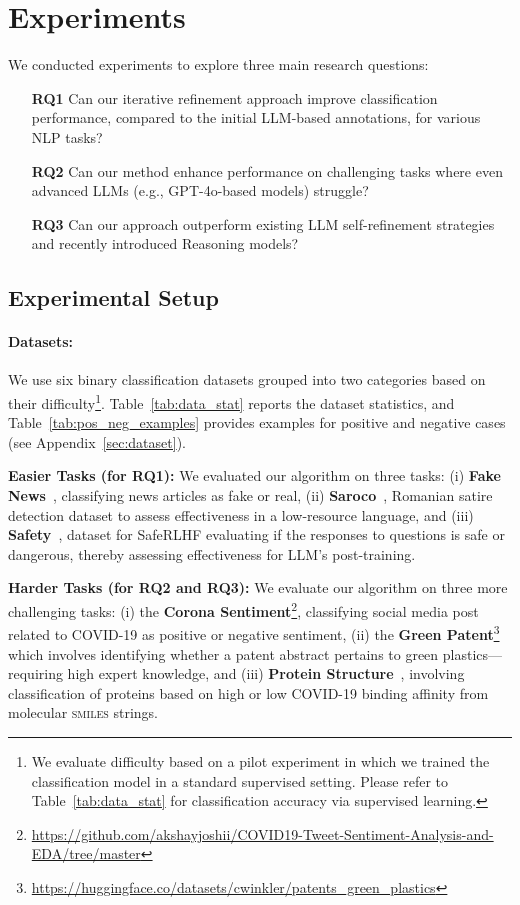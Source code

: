 \section{Experiments}
We conducted experiments to explore three main research questions:

\begin{enumerate}
    \item[\textbf{RQ1}] Can our iterative refinement approach improve classification performance, compared to the initial LLM-based annotations, for various NLP tasks?
    \item[\textbf{RQ2}] Can our method enhance performance on challenging tasks where even advanced LLMs (e.g., GPT-4o-based models) struggle?
    \item[\textbf{RQ3}] Can our approach outperform existing LLM self-refinement strategies and recently introduced Reasoning models?
\end{enumerate}

\subsection{Experimental Setup}
\paragraph{Datasets:}
We use six binary classification datasets grouped into two categories based on their difficulty\footnote{We evaluate difficulty based on a pilot experiment in which we trained the classification model in a standard supervised setting. Please refer to Table~\ref{tab:data_stat} for classification accuracy via supervised learning.}. Table~\ref{tab:data_stat} reports the dataset statistics, and Table~\ref{tab:pos_neg_examples} provides examples for positive and negative cases (see Appendix~\ref{sec:dataset}).

\textbf{Easier Tasks (for RQ1):} We evaluated our algorithm on three tasks: (i) \textbf{Fake News}~\citep{ahmed2018detecting}, classifying news articles as fake or real, (ii) \textbf{Saroco}~\citep{rogoz-etal-2021-saroco}, Romanian satire detection dataset to assess effectiveness in a low-resource language, and (iii) \textbf{Safety}~\citep{Dai2024-jq}, dataset for SafeRLHF evaluating if the responses to questions is safe or dangerous, thereby assessing effectiveness for LLM's post-training.

\textbf{Harder Tasks (for RQ2 and RQ3):} We evaluate our algorithm on three more challenging tasks: (i) the \textbf{Corona Sentiment}\footnote{\scriptsize{\url{https://github.com/akshayjoshii/COVID19-Tweet-Sentiment-Analysis-and-EDA/tree/master}}}, classifying social media post related to COVID-19 as positive or negative sentiment, (ii) the \textbf{Green Patent}\footnote{\scriptsize{\url{https://huggingface.co/datasets/cwinkler/patents_green_plastics}}} which involves identifying whether a patent abstract pertains to green plastics—requiring high expert knowledge, and (iii) \textbf{Protein Structure}~\citep{Blanchard2022-lx}, involving classification of proteins based on high or low COVID-19 binding affinity from molecular \textsc{smiles} strings.

